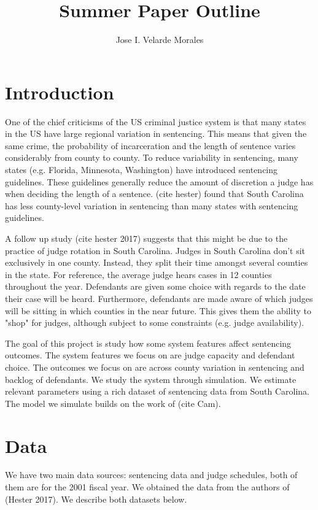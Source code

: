 \documentclass[11pt]{article}
\title{Summer Paper Outline}
\author{Jose I. Velarde Morales}
\begin{document}
\maketitle
\tableofcontents

\section{Introduction}
  One of the chief criticisms of the US criminal justice system is that many states in the US have large regional variation in sentencing. This means that given the same crime, the probability of incarceration and the length of sentence varies considerably from county to county. To reduce variability in sentencing, many states (e.g. Florida, Minnesota, Washington) have introduced sentencing guidelines. These guidelines generally reduce the amount of discretion a judge has when deciding the length of a sentence. (cite hester) found that South Carolina has less county-level variation in sentencing than many states with sentencing guidelines.

  A follow up study (cite hester 2017) suggests that this might be due to the practice of judge rotation in South Carolina.
  Judges in South Carolina don't sit exclusively in one county. Instead, they split their time amongst several counties in the state. For reference, the average judge hears cases in 12 counties throughout the year. Defendants are given some choice with regards to the date their case will be heard. Furthermore, defendants are made aware of which judges will be sitting in which counties in the near future. This gives them the ability to "shop" for judges, although subject to some constraints (e.g. judge availability).

  The goal of this project is study how some system features affect sentencing outcomes. The system features we focus on are judge capacity and defendant choice. The outcomes we focus on are across county variation in sentencing and backlog of defendants. We study the system through simulation. We estimate relevant parameters using a rich dataset of sentencing data from South Carolina. The model we simulate builds on the work of (cite Cam).

\section{Data}
  We have two main data sources: sentencing data and judge schedules, both of them are for the 2001 fiscal year. We obtained the data from the authors of (Hester 2017). We describe both datasets below.
\end{document}
